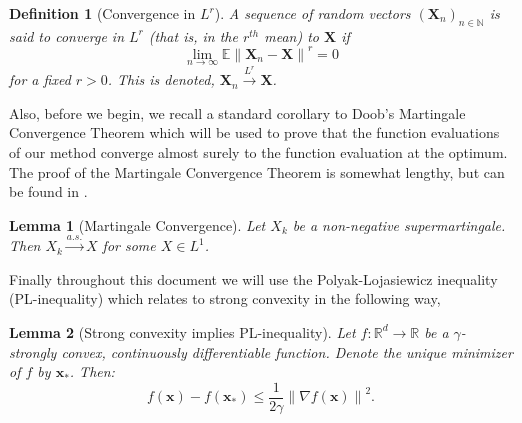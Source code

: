 \documentclass[11pt] {article}
\newcommand{\norm}[1]{\left\lVert#1\right\rVert}
\newcommand{\X}{\pmb{X}}
\newcommand{\x}{\pmb{x}}
\newcommand{\y}{\pmb{y}}
\newcommand{\Expectation}{\mathbb{E}}
\newcommand{\convas}{\overset{a.s.}{\longrightarrow}}
\newcommand{\T}{\mathsf{T}}
\newcommand{\naturals}{\mathbb{N}}
\newcommand{\reals}{\mathbb{R}}
\newtheorem{definition}{Definition}
\newtheorem{lemma}{Lemma}
\begin{document}
 
 
 \begin{definition}[Convergence in $L^r$]
 	A sequence of random vectors $(\X_n)_{n\in\naturals}$ is said to converge in $L^r$ (that is, in the $r^{th}$ mean) to $\X$ if
 	\begin{equation*}
 	\lim_{n\to\infty} \Expectation\norm{\X_n-\X}^r = 0
 	\end{equation*}
 	for a fixed $r>0$. This is denoted, $\X_n \overset{L^r}{\longrightarrow} \X$.	
 \end{definition}
 


Also, before we begin, we recall a standard corollary to Doob's Martingale Convergence Theorem which will be used to prove that the function evaluations of our method converge almost surely to the function evaluation at the optimum.  The proof of the Martingale Convergence Theorem  is somewhat lengthy, but can be found in \cite{jacod1999probability}.


%	
%	

\begin{lemma}[Martingale Convergence]\label{martconv}
	Let $X_k$ be a non-negative supermartingale. Then $X_k \convas X$ for some $X \in L^1$.
\end{lemma}

Finally throughout this document we will use the Polyak-Lojasiewicz inequality (PL-inequality) which relates to strong convexity in the following way,


\begin{lemma}[Strong convexity implies PL-inequality]\label{PLLemma}
	Let $f :\reals^d \to \reals$ be a $\gamma$-strongly convex, continuously differentiable function. Denote the unique minimizer of $f$ by  $\x_*$. Then:
	\begin{equation}\label{PLineq}
		f(\x) - f(\x_*) \leq \frac{1}{2\gamma} \norm{\nabla f(\x)}^2.
	\end{equation}
\end{lemma}
\end{document}
